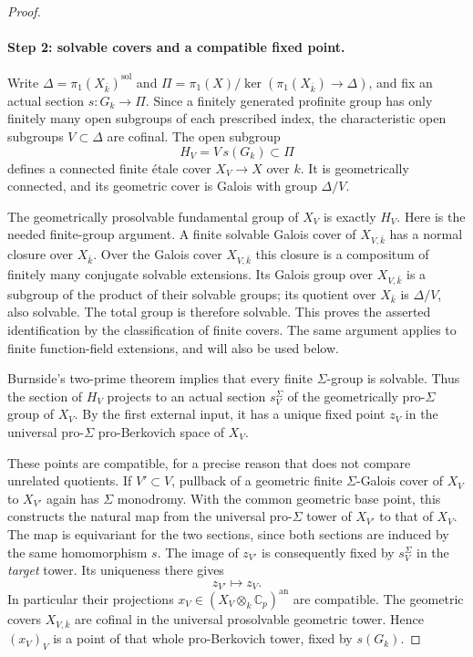 \begin{proof}
\paragraph{Step 2: solvable covers and a compatible fixed point.}

Write $\Delta=\pi_1(X_{\bar k})^{\mathrm{sol}}$ and
$\Pi=\pi_1(X)/\ker(\pi_1(X_{\bar k})\to\Delta)$, and fix an actual
section $s:G_k\to\Pi$.  Since a finitely generated profinite group has
only finitely many open subgroups of each prescribed index, the
characteristic open subgroups $V\subset\Delta$ are cofinal.  The open
subgroup
\[
                 H_V=V\,s(G_k)\subset\Pi
\]
defines a connected finite \'etale cover $X_V\to X$ over $k$.
It is geometrically connected, and its geometric cover is Galois
with group $\Delta/V$.

The geometrically prosolvable fundamental group of $X_V$ is exactly
$H_V$.  Here is the needed finite-group argument.  A finite solvable
Galois cover of $X_{V,\bar k}$ has a normal closure over $X_{\bar k}$.
Over the Galois cover $X_{V,\bar k}$ this closure is a compositum of
finitely many conjugate solvable extensions.  Its Galois group over
$X_{V,\bar k}$ is a subgroup of the product of their solvable groups;
its quotient over $X_{\bar k}$ is $\Delta/V$, also solvable.  The total
group is therefore solvable.  This proves the asserted identification
by the classification of finite covers.  The same argument applies to
finite function-field extensions, and will also be used below.

Burnside's two-prime theorem implies that every finite $\Sigma$-group
is solvable.  Thus the section of $H_V$ projects to an actual section
$s_V^\Sigma$ of the geometrically pro-$\Sigma$ group of $X_V$.
By the first external input, it has a unique fixed point $z_V$ in
the universal pro-$\Sigma$ pro-Berkovich space of $X_V$.

These points are compatible, for a precise reason that does not
compare unrelated quotients.  If $V'\subset V$, pullback of a
geometric finite $\Sigma$-Galois cover of $X_V$ to $X_{V'}$ again has
$\Sigma$ monodromy.  With the common geometric base point, this
constructs the natural map from the universal pro-$\Sigma$ tower of
$X_{V'}$ to that of $X_V$.  The map is equivariant for the two sections,
since both sections are induced by the same homomorphism $s$.
The image of $z_{V'}$ is consequently fixed by $s_V^\Sigma$ in the
\emph{target} tower.  Its uniqueness there gives
\[
                         z_{V'}\longmapsto z_V.
\]
In particular their projections
$x_V\in (X_V\otimes_k\mathbb C_p)^{\mathrm{an}}$ are compatible.
The geometric covers $X_{V,\bar k}$ are cofinal in the universal
prosolvable geometric tower.  Hence $(x_V)_V$ is a point of that
whole pro-Berkovich tower, fixed by $s(G_k)$.


\end{proof}
